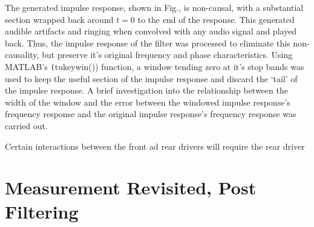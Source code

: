 \documentclass{report}
\begin{document}
            


            The generated impulse response, shown in Fig., is non-causal, with a substantial section wrapped back around $t=0$ to the end of the response.
            This generated audible artifacts and ringing when convolved with any audio signal and played back.
            Thus, the impulse response of the filter was processed to eliminate this non-causality, but preserve it's original frequency and phase characteristics.
            Using MATLAB's \texttt(tukeywin()) function, a window tending zero at it's stop bands was used to keep the useful section of the impulse response and discard the `tail' of the impulse response.
            A brief investigation into the relationship between the width of the window and the error between the windowed impulse response's frequency response and the original impulse response's frequency response was carried out.

            Certain interactions between the front ad rear drivers will require the rear driver



    \section{Measurement Revisited, Post Filtering}
\end{document}
